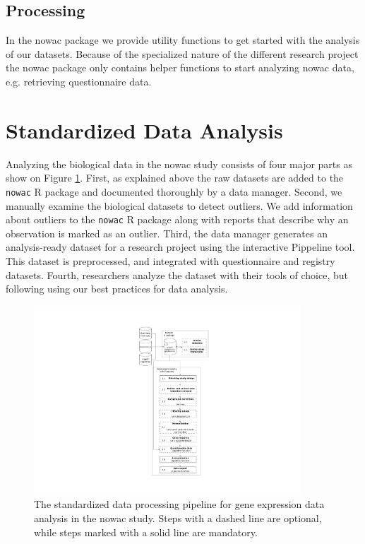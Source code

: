 \subsection{Processing} 
In the \gls{nowac} package we provide utility functions to get started with the
analysis of our datasets. Because of the specialized nature of the different
research project the \gls{nowac} package only contains helper functions to start
analyzing \gls{nowac} data, e.g. retrieving questionnaire data. 


\section{Standardized Data Analysis}
Analyzing the biological data in the \gls{nowac} study consists of four major
parts as show on Figure \ref{fig:uit_pippeline}.  First, as explained above the
raw datasets are added to the \texttt{nowac} R package and documented thoroughly
by a data manager.  Second, we manually examine the biological datasets to
detect outliers. We add information about outliers to the \texttt{nowac} R
package along with reports that describe why an observation is marked as an
outlier.  Third, the data manager generates an analysis-ready dataset for a
research project using the interactive Pippeline tool. This dataset is
preprocessed, and integrated with questionnaire and registry datasets. Fourth,
researchers analyze the dataset with their tools of choice, but following using
our best practices for data analysis.

\begin{figure}
    \centering
    \includegraphics[width=10cm]{figures/uit_pippeline_rm_refs.pdf}
    \caption{The standardized data processing pipeline for gene expression data
    analysis in the \gls{nowac} study. Steps with a dashed line are optional,
    while steps marked with a solid line are mandatory.}
    \label{fig:uit_pippeline}
\end{figure}


